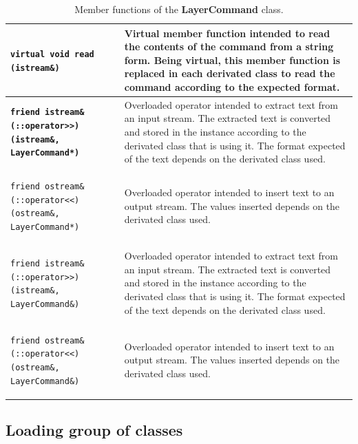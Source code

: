 \documentclass[11pt,twoside,openany,x11names,svgnames]{memoir}
\begin{document}
\begin{table}[h]
\begin{tabular}{| >{\bfseries}p{8.5cm} | p{7cm} |}
	\texttt{virtual void read (istream\&)} & Virtual member function intended to read the contents of the command from a string form. Being virtual, this member function is replaced in each derivated class to read the command according to the expected format. \\
	
	\hline	
		
	\texttt{friend istream\& (::operator>>) (istream\&, LayerCommand*)} & Overloaded operator intended to extract text from an input stream. The extracted text is converted and stored in the instance according to the derivated class that is using it. The format expected of the text depends on the derivated class used. \\
	
	\hline
	
	\texttt{friend ostream\& (::operator<<) (ostream\&, LayerCommand*)} & Overloaded operator intended to insert text to an output stream. The values inserted depends on the derivated class used. \\
	
	\hline
	
	\texttt{friend istream\& (::operator>>) (istream\&, LayerCommand\&)} & Overloaded operator intended to extract text from an input stream. The extracted text is converted and stored in the instance according to the derivated class that is using it. The format expected of the text depends on the derivated class used. \\
	
	\hline
	
	\texttt{friend ostream\& (::operator<<) (ostream\&, LayerCommand\&)} & Overloaded operator intended to insert text to an output stream. The values inserted depends on the derivated class used. \\	
	
	\hline
\end{tabular}
\caption{Member functions of the \textbf{LayerCommand} class.}
\label{tab:LayerCommand-MemberFunctions}
\end{table}

\clearpage

\subsection{Loading group of classes}\label{Loading-group-of-classes}
\end{document}
